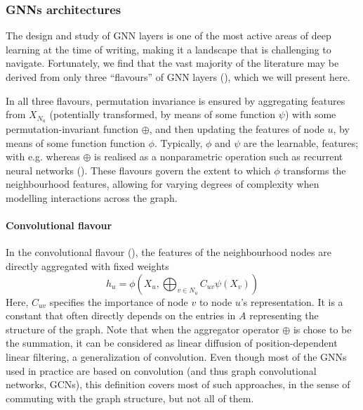 \documentclass[binding=0.6cm]{sapthesis}
\newcommand{\mycite}[1]{(\cite{#1})}
\begin{document}
\subsubsection{GNNs architectures}
\label{sec:bg.gnn.gnn-archs}
The design and study of GNN layers is one of the most active areas of deep learning at the time of writing, making it a landscape that is challenging to navigate. Fortunately, we find that the vast majority of the literature may be derived from only three “flavours” of GNN layers \mycite{bronstein2021geometric}, which we will present here.

In all three flavours, permutation invariance is ensured by aggregating features from $X_{N_u}$ (potentially transformed, by means of some function $\psi$) with some permutation-invariant function $\oplus$, and then updating the features of node $u$, by means of some function function $\phi$. Typically, $\phi$ and $\psi$ are the learnable, features; with e.g. whereas $\oplus$ is realised as a nonparametric operation such as recurrent neural networks (\cite{murphy2019janossy}). These flavours govern the extent to which $\phi$ transforms the neighbourhood features, allowing for varying degrees of complexity when modelling interactions across the graph.

\paragraph{Convolutional flavour}
\label{sec:bg.gnn.gcn}
In the convolutional flavour (\cite{kipf2016-semisupervised,defferrard2017-convolutional,wu2019-simplifying}), the features of the neighbourhood nodes are directly aggregated with fixed weights
\begin{equation}
    h_u = \phi \left( X_u, \bigoplus_{v \in N_u} C_{uv} \psi(X_v) \right)
\end{equation}
Here, $C_{uv}$ specifies the importance of node $v$ to node $u$’s representation. It is a constant that often directly depends on the entries in $A$ representing the structure of the graph. Note that when the aggregator operator $\oplus$ is chose to be the summation, it can be considered as linear diffusion of position-dependent linear filtering, a generalization of convolution. Even though most of the GNNs used in practice are based on convolution (and thus graph convolutional networks, GCNs), this definition covers most of such approaches, in the sense of commuting with the graph structure, but not all of them.
\end{document}
